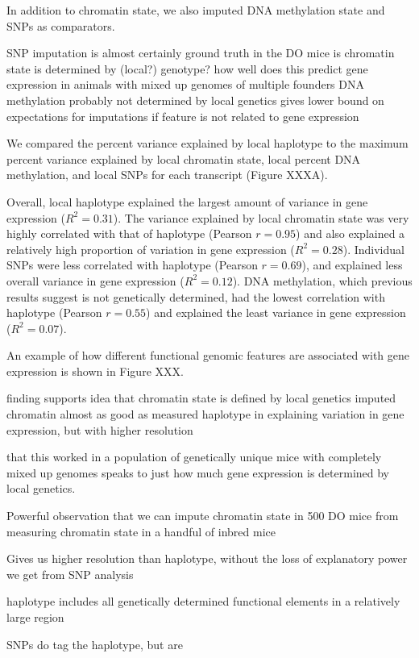 \documentclass[10pt,letterpaper]{article}
\begin{document}
In addition to chromatin state, we also imputed DNA methylation state
and SNPs as comparators.

SNP imputation is almost certainly ground truth in the DO mice is
chromatin state is determined by (local?) genotype? how well does this
predict gene expression in animals with mixed up genomes of multiple
founders DNA methylation probably not determined by local genetics gives
lower bound on expectations for imputations if feature is not related to
gene expression

We compared the percent variance explained by local haplotype to the
maximum percent variance explained by local chromatin state, local
percent DNA methylation, and local SNPs for each transcript (Figure
XXXA).

Overall, local haplotype explained the largest amount of variance in
gene expression (\(R^2 = 0.31\)). The variance explained by local
chromatin state was very highly correlated with that of haplotype
(Pearson \(r = 0.95\)) and also explained a relatively high proportion
of variation in gene expression (\(R^2 = 0.28\)). Individual SNPs were
less correlated with haplotype (Pearson \(r = 0.69\)), and explained
less overall variance in gene expression (\(R^2 = 0.12\)). DNA
methylation, which previous results suggest is not genetically
determined, had the lowest correlation with haplotype (Pearson
\(r = 0.55\)) and explained the least variance in gene expression
(\(R^2 = 0.07\)).

An example of how different functional genomic features are associated
with gene expression is shown in Figure XXX.

finding supports idea that chromatin state is defined by local genetics
imputed chromatin almost as good as measured haplotype in explaining
variation in gene expression, but with higher resolution

that this worked in a population of genetically unique mice with
completely mixed up genomes speaks to just how much gene expression is
determined by local genetics.

Powerful observation that we can impute chromatin state in 500 DO mice
from measuring chromatin state in a handful of inbred mice

Gives us higher resolution than haplotype, without the loss of
explanatory power we get from SNP analysis

haplotype includes all genetically determined functional elements in a
relatively large region

SNPs do tag the haplotype, but are
\end{document}
